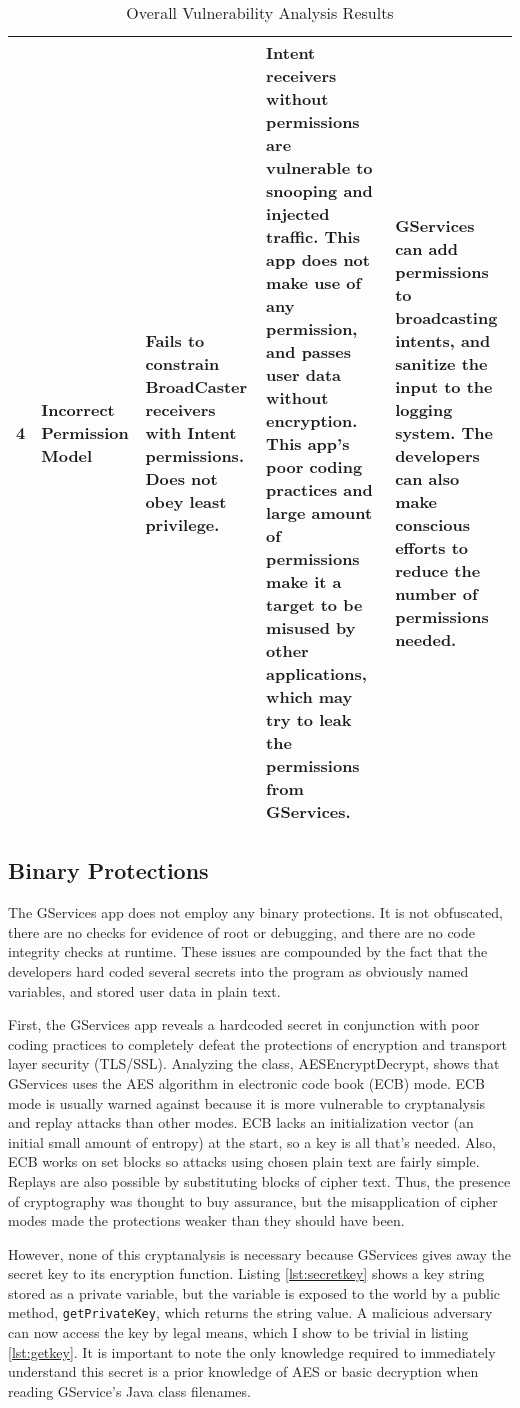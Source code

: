 \documentclass[conference,compsoc]{IEEEtran}
\begin{document}
\begin{table*}[t]
\begin{tabular}{ |p{.25cm}|p{3cm}|p{3cm}|p{3cm}|p{3cm}| }
4 & Incorrect Permission Model &
Fails to constrain BroadCaster receivers with Intent permissions. Does not obey least privilege.
&
Intent receivers without permissions are vulnerable to snooping and injected traffic. This app does not make use of any permission, and passes user data without encryption.\newline
This app's poor coding practices and large amount of permissions make it a target to be misused by other applications, which may try to leak the permissions from GServices.
&
GServices can add permissions to broadcasting intents, and sanitize the input to the logging system.
The developers can also make conscious efforts to reduce the number of permissions needed.
\\
\hline
\end{tabular}
\caption{Overall Vulnerability Analysis Results}
\label{table:t1}
\end{table*}


\subsection{Binary Protections}
The GServices app does not employ any binary protections. It is not obfuscated, there are no checks for evidence of root or debugging, and there are no code integrity checks at runtime. These issues are compounded by the fact that the developers hard coded several secrets into the program as obviously named variables, and stored user data in plain text.

First, the GServices app reveals a hardcoded secret in conjunction with poor coding practices to completely defeat the protections of encryption and transport layer security (TLS/SSL). Analyzing the class, AESEncryptDecrypt, shows that GServices uses the AES algorithm in electronic code book (ECB) mode. ECB mode is usually warned against because it is more vulnerable to cryptanalysis and replay attacks than other modes. ECB lacks an initialization vector (an initial small amount of entropy) at the start, so a key is all that's needed. Also, ECB works on set blocks so attacks using chosen plain text are fairly simple. Replays are also possible by substituting blocks of cipher text. Thus, the presence of cryptography was thought to buy assurance, but the misapplication of cipher modes made the protections weaker than they should have been.

However, none of this cryptanalysis is necessary because GServices gives away the secret key to its encryption function. Listing \ref{lst:secretkey} shows a key string stored as a private variable, but the variable is exposed to the world by a public method, \texttt{getPrivateKey}, which returns the string value. A malicious adversary can now access the key by legal means, which I show to be trivial in listing \ref{lst:getkey}. It is important to note the only knowledge required to immediately understand this secret is a prior knowledge of AES or basic decryption when reading GService's Java class filenames.
\end{document}
